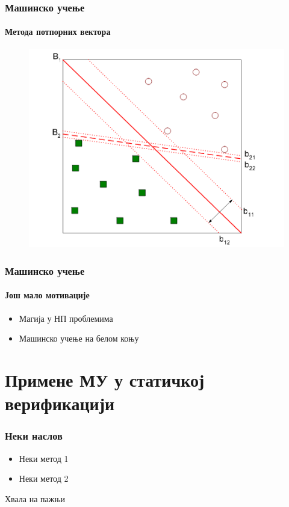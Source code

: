 \documentclass{beamer}
\begin{document}
\begin{frame}
\frametitle{Машинско учење}
\framesubtitle{Метода потпорних вектора}
\begin{figure}
\centering
\includegraphics[scale=0.4]{slike/svm.png}
\end{figure}
\end{frame}
\begin{frame}
\frametitle{Машинско учење}
\framesubtitle{Још мало мотивације}
\begin{itemize}
 	\item Магија у НП проблемима
 	\item Машинско учење на белом коњу
\end{itemize}
\end{frame}



\section{Примене МУ у статичкој верификацији}

\begin{frame}
\frametitle{Неки наслов}
\begin{itemize}
\item Неки метод 1
\item Неки метод 2
\end{itemize}
\end{frame}
\begin{frame}
\Huge{\centerline{Хвала на пажњи}}
\end{frame}



\end{document}
